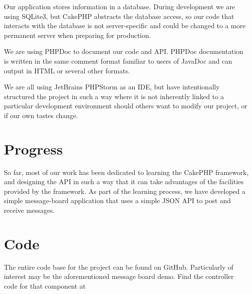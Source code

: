 \documentclass[11pt]{article}
\begin{document}
Our application stores information in a database. During development we are using SQLite3, but CakePHP abstracts the database access, so our code that interacts with the database is not server-specific and could be changed to a more permanent server when preparing for production.

We are using PHPDoc to document our code and API. PHPDoc documentation is written in the same comment format familiar to users of JavaDoc and can output in HTML or several other formats.

We are all using JetBrains PHPStorm as an IDE, but have intentionally structured the project in such a way where it is not inherently linked to a particular development environment should others want to modify our project, or if our own tastes change.

\section*{Progress}
So far, most of our work has been dedicated to learning the CakePHP framework, and designing the API in such a way that it can take advantages of the facilities provided by the framework. As part of the learning process, we have developed a simple message-board application that uses a simple JSON API to post and receive messages.

\section*{Code}
The entire code base for the project can be found on GitHub. Particularly of interest may be the aforementioned message board demo. Find the controller code for that component at 
\end{document}
